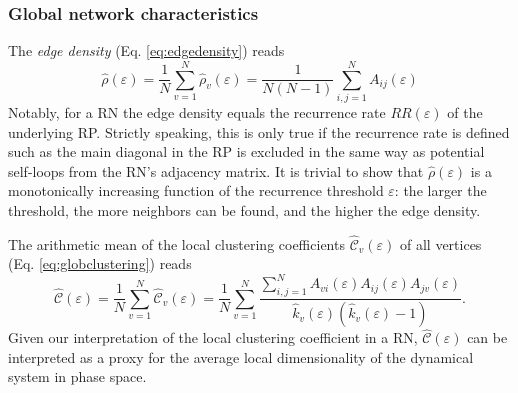 			\subsubsection{Global network characteristics}
		The \textit{edge density} (Eq. \eqref{eq:edgedensity}) reads 
\begin{equation}
\hat{\rho}(\varepsilon)=\frac{1}{N}\sum_{v=1}^N \hat{\rho}_v(\varepsilon)=\frac{1}{N(N-1)} \sum_{i,j=1}^N A_{ij}(\varepsilon)
\label{eq:edgedensityRN}
\end{equation}
\noindent
Notably, for a RN the edge density equals the recurrence rate $RR(\varepsilon)$ of the underlying RP. Strictly speaking, this is only true if the recurrence rate is defined such as the main diagonal in the RP is excluded in the same way as potential self-loops from the RN's adjacency matrix. It is trivial to show that $\hat{\rho}(\varepsilon)$ is a monotonically increasing function of the recurrence threshold $\varepsilon$: the larger the threshold, the more neighbors can be found, and the higher the edge density.

		The arithmetic mean of the local clustering coefficients $\hat{\mathcal{C}}_v(\varepsilon)$ of all vertices (Eq. \eqref{eq:globclustering}) reads 
\begin{equation}
\hat{\mathcal{C}}(\varepsilon)=\frac{1}{N}\sum_{v=1}^N \hat{\mathcal{C}}_v(\varepsilon)
= \frac{1}{N}\sum_{v=1}^N \frac{\sum_{i,j=1}^N A_{vi}(\varepsilon) A_{ij}(\varepsilon) A_{jv}(\varepsilon)}{\hat{k}_v(\varepsilon)(\hat{k}_v(\varepsilon)-1)}.
\label{eq:globclusteringRN}
\end{equation}
\noindent
Given our interpretation of the local clustering coefficient in a RN, $\hat{\mathcal{C}}(\varepsilon)$ can be interpreted as a proxy for the average local dimensionality of the dynamical system in phase space.

